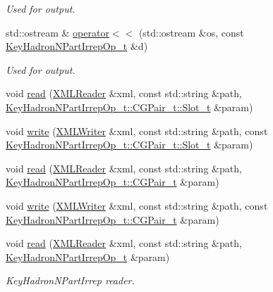 \begin{DoxyCompactItemize}
\begin{DoxyCompactList}\small\item\em Used for output. \end{DoxyCompactList}\item 
std\+::ostream \& \mbox{\hyperlink{namespaceHadron_a6d4dd7ed7a6efa27888f4ea9bdd20e51}{operator$<$$<$}} (std\+::ostream \&os, const \mbox{\hyperlink{structHadron_1_1KeyHadronNPartIrrepOp__t}{Key\+Hadron\+N\+Part\+Irrep\+Op\+\_\+t}} \&d)
\begin{DoxyCompactList}\small\item\em Used for output. \end{DoxyCompactList}\item 
void \mbox{\hyperlink{namespaceHadron_ab955c28b5566e0df089a26a611d4bf03}{read}} (\mbox{\hyperlink{classADATXML_1_1XMLReader}{X\+M\+L\+Reader}} \&xml, const std\+::string \&path, \mbox{\hyperlink{structHadron_1_1KeyHadronNPartIrrepOp__t_1_1CGPair__t_1_1Slot__t}{Key\+Hadron\+N\+Part\+Irrep\+Op\+\_\+t\+::\+C\+G\+Pair\+\_\+t\+::\+Slot\+\_\+t}} \&param)
\item 
void \mbox{\hyperlink{namespaceHadron_a005000ac92ae829ca325627dae07fb51}{write}} (\mbox{\hyperlink{classADATXML_1_1XMLWriter}{X\+M\+L\+Writer}} \&xml, const std\+::string \&path, const \mbox{\hyperlink{structHadron_1_1KeyHadronNPartIrrepOp__t_1_1CGPair__t_1_1Slot__t}{Key\+Hadron\+N\+Part\+Irrep\+Op\+\_\+t\+::\+C\+G\+Pair\+\_\+t\+::\+Slot\+\_\+t}} \&param)
\item 
void \mbox{\hyperlink{namespaceHadron_a7d8926bf48de7c75f93c8ffc8b6bab3e}{read}} (\mbox{\hyperlink{classADATXML_1_1XMLReader}{X\+M\+L\+Reader}} \&xml, const std\+::string \&path, \mbox{\hyperlink{structHadron_1_1KeyHadronNPartIrrepOp__t_1_1CGPair__t}{Key\+Hadron\+N\+Part\+Irrep\+Op\+\_\+t\+::\+C\+G\+Pair\+\_\+t}} \&param)
\item 
void \mbox{\hyperlink{namespaceHadron_ad194604b0eb61ca7e7ffa89d1ef4c879}{write}} (\mbox{\hyperlink{classADATXML_1_1XMLWriter}{X\+M\+L\+Writer}} \&xml, const std\+::string \&path, const \mbox{\hyperlink{structHadron_1_1KeyHadronNPartIrrepOp__t_1_1CGPair__t}{Key\+Hadron\+N\+Part\+Irrep\+Op\+\_\+t\+::\+C\+G\+Pair\+\_\+t}} \&param)
\item 
void \mbox{\hyperlink{namespaceHadron_ac345c2bc828c82e6774e6bc01e57535e}{read}} (\mbox{\hyperlink{classADATXML_1_1XMLReader}{X\+M\+L\+Reader}} \&xml, const std\+::string \&path, \mbox{\hyperlink{structHadron_1_1KeyHadronNPartIrrepOp__t}{Key\+Hadron\+N\+Part\+Irrep\+Op\+\_\+t}} \&param)
\begin{DoxyCompactList}\small\item\em Key\+Hadron\+N\+Part\+Irrep reader. \end{DoxyCompactList}\item 

\end{DoxyCompactItemize}
